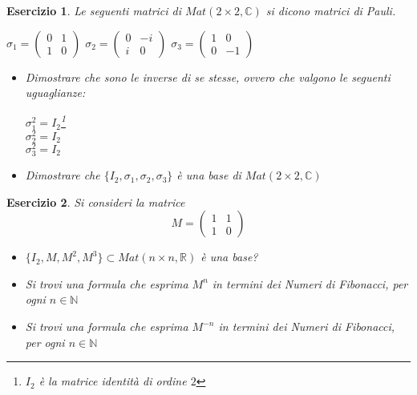 \documentclass{article}
\newtheorem{es}{Esercizio}
\begin{document}
{\begin{es}
    Le seguenti matrici di $Mat(2\times 2,\mathbb{C})$ si dicono matrici di Pauli.
    \begin{center}
        $\sigma_1=\begin{pmatrix}
            0 & 1\\
            1 & 0
        \end{pmatrix}$
        $\sigma_2=\begin{pmatrix}
            0 & -i\\
            i & 0
        \end{pmatrix}$
        $\sigma_3=\begin{pmatrix}
            1 & 0\\
            0 & -1
        \end{pmatrix}$
    \end{center}
    \begin{itemize}
        \item Dimostrare che sono le inverse di se stesse, ovvero che valgono le seguenti uguaglianze:
    \begin{center}
        $\sigma_1^2=I_2$\footnote{$I_2$ è la matrice identità di ordine $2$}\\
        $\sigma_2^2=I_2$\\
        $\sigma_3^2=I_2$
    \end{center}
    \item Dimostrare che $\{I_2,\sigma_1,\sigma_2,\sigma_3\}$ è una base di $Mat(2\times 2,\mathbb{C})$
    \end{itemize}
\end{es}












\begin{es}
    Si consideri la matrice 
    $$M=\begin{pmatrix}
            1 & 1\\
            1 & 0
        \end{pmatrix}$$
    \begin{itemize}
    \item $\{I_2,M, M^2, M^3\}\subset Mat(n\times n, \mathbb{R})$ è una base?
    \item Si trovi una formula che esprima $M^n$ in termini dei Numeri di Fibonacci, per ogni $n\in \mathbb{N}$
    \item Si trovi una formula che esprima $M^{-n}$ in termini dei Numeri di Fibonacci, per ogni $n\in \mathbb{N}$
    \end{itemize}
\end{es}


}
\end{document}
